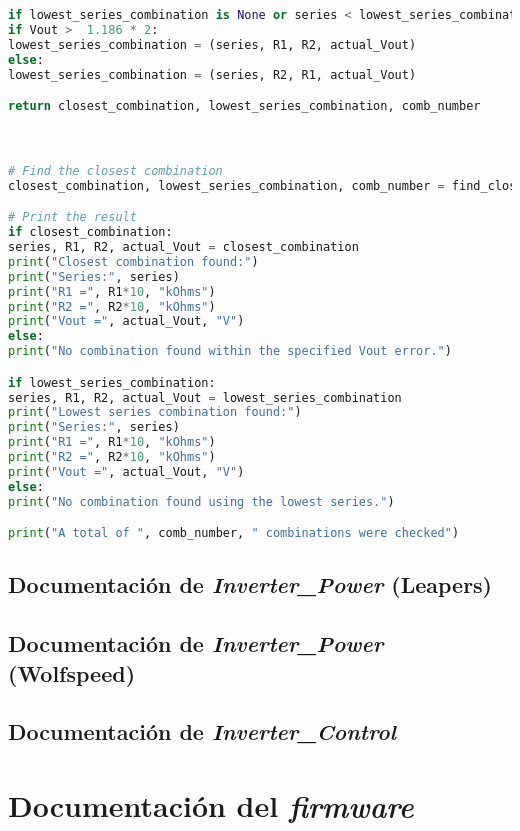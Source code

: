 \begin{lstlisting}[language=Python, basicstyle=\ttfamily\small, breaklines=true, frame=single]
if lowest_series_combination is None or series < lowest_series_combination[0]:
if Vout >  1.186 * 2:
lowest_series_combination = (series, R1, R2, actual_Vout)
else:
lowest_series_combination = (series, R2, R1, actual_Vout)

return closest_combination, lowest_series_combination, comb_number



# Find the closest combination
closest_combination, lowest_series_combination, comb_number = find_closest_combination(Vout, Vout_error)

# Print the result
if closest_combination:
series, R1, R2, actual_Vout = closest_combination
print("Closest combination found:")
print("Series:", series)
print("R1 =", R1*10, "kOhms")
print("R2 =", R2*10, "kOhms")
print("Vout =", actual_Vout, "V")
else:
print("No combination found within the specified Vout error.")

if lowest_series_combination:
series, R1, R2, actual_Vout = lowest_series_combination
print("Lowest series combination found:")
print("Series:", series)
print("R1 =", R1*10, "kOhms")
print("R2 =", R2*10, "kOhms")
print("Vout =", actual_Vout, "V")
else:
print("No combination found using the lowest series.")

print("A total of ", comb_number, " combinations were checked")
\end{lstlisting}
\subsection{Documentación de \textit{Inverter\_Power} (Leapers)}

\subsection{Documentación de \textit{Inverter\_Power} (Wolfspeed)}

\subsection{Documentación de \textit{Inverter\_Control}}


\newpage
\section{Documentación del \textit{firmware}}

